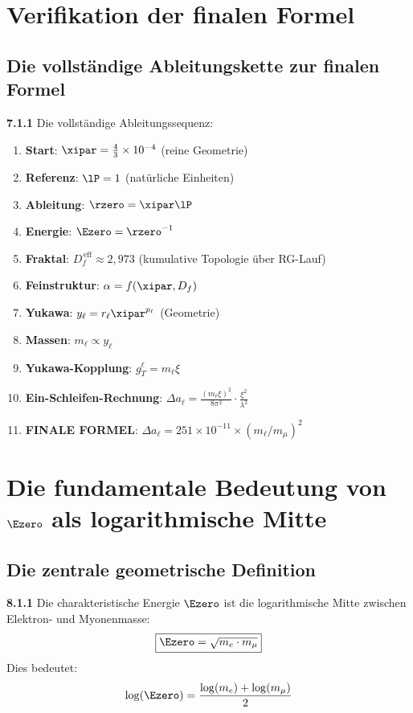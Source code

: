 	\section{Verifikation der finalen Formel}
	
	\subsection{Die vollständige Ableitungskette zur finalen Formel}
	
	\noindent \textbf{7.1.1} Die vollständige Ableitungssequenz:
	\begin{enumerate}
		\item \textbf{Start}: $\xipar = \frac{4}{3} \times 10^{-4}$ (reine Geometrie)
		\item \textbf{Referenz}: $\lP = 1$ (natürliche Einheiten)
		\item \textbf{Ableitung}: $\rzero = \xipar \lP$
		\item \textbf{Energie}: $\Ezero = \rzero^{-1}$
		\item \textbf{Fraktal}: $D_f^{\,\text{eff}} \approx 2{,}973$ (kumulative Topologie über RG-Lauf)
		\item \textbf{Feinstruktur}: $\alpha = f(\xipar, D_f)$
		\item \textbf{Yukawa}: $y_\ell = r_\ell \xipar^{p_\ell}$ (Geometrie)
		\item \textbf{Massen}: $m_\ell \propto y_\ell$
		\item \textbf{Yukawa-Kopplung}: $g_T^\ell = m_\ell \xi$
		\item \textbf{Ein-Schleifen-Rechnung}: $\Delta a_\ell = \frac{(m_\ell \xi)^2}{8\pi^2} \cdot \frac{\xi^2}{\lambda^2}$
		\item \textbf{FINALE FORMEL}: $\Delta a_\ell = 251 \times 10^{-11} \times (m_\ell/m_\mu)^2$
	\end{enumerate}

\section{Die fundamentale Bedeutung von $\Ezero$ als logarithmische Mitte}

\subsection{Die zentrale geometrische Definition}

\begin{tcolorbox}[colback=yellow!10!white,colframe=red!75!black,title=Fundamentale Definition]
	\noindent \textbf{8.1.1} Die charakteristische Energie $\Ezero$ ist die logarithmische Mitte zwischen Elektron- und Myonenmasse:
	\begin{equation}
		\boxed{\Ezero = \sqrt{m_e \cdot m_\mu}}
		\label{eq:E0_fundamental}
	\end{equation}
	Dies bedeutet:
	\begin{equation}
		\log(\Ezero) = \frac{\log(m_e) + \log(m_\mu)}{2}
		\label{eq:E0_logarithmic}
	\end{equation}
\end{tcolorbox}

